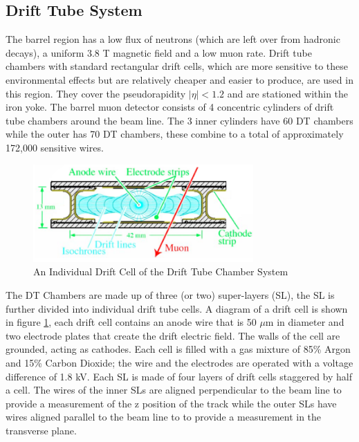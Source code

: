 \subsection{Drift Tube System}
The barrel region has a low flux of neutrons (which are left over 
from hadronic decays), a uniform 3.8 T magnetic field and a low 
muon rate. Drift tube chambers with standard rectangular drift cells, 
which are more sensitive to these environmental effects but are 
relatively cheaper and easier to produce, are used in this region. 
They cover the pseudorapidity $|\eta|<1.2$ and are stationed within 
the iron yoke. The barrel muon detector consists of 4 concentric
cylinders of drift tube chambers around the beam line. The 3 inner
cylinders have 60 DT chambers while the outer has 70 DT chambers,
these combine to a total of approximately 172,000 sensitive wires.
\begin{figure}[hb]
  \centering
	\includegraphics[width=0.75\textwidth]{images/driftCell.png}
  	\caption[Individual Drift Cell]
   	{An Individual Drift Cell of the Drift Tube Chamber System}
	\label{fig:driftCell}
\end{figure}
The DT Chambers are made up of three (or two) super-layers (SL), the 
SL is further divided into individual drift tube cells. 
A diagram of a drift cell is shown in figure \ref{fig:driftCell},
each drift cell contains an anode wire that is 50 $\mu$m in diameter
and two electrode plates that create the drift electric field. The walls
of the cell are grounded, acting as cathodes. Each cell is filled with a gas
mixture of 85\% Argon and 15\% Carbon Dioxide; the wire and the
electrodes are operated with a voltage difference of 1.8 kV. Each
SL is made of four layers of drift cells staggered by half a cell.
The wires of the inner SLs are aligned perpendicular to the beam line
to provide a measurement of the z position of the track while the 
outer SLs have wires aligned parallel to the beam line to 
to provide a measurement in the transverse plane. 

